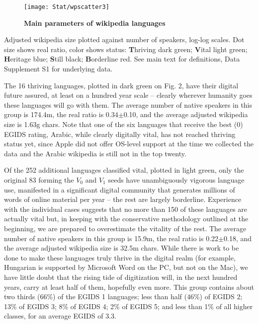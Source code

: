 \documentclass[10pt]{article}
\begin{document}
\newpage
\begin{figure}
\vspace*{-8mm}\hspace*{-20mm}\texttt{[image: Stat/wpscatter3]}



\caption{
{\bf Main parameters of wikipedia languages}
}
\label{Figure_2}
\end{figure}
Adjusted wikipedia size plotted against number of speakers, log-log scales.
Dot size shows real ratio, color shows status: {\bf T}hriving dark green; {\bf
  V}ital light green; {\bf H}eritage blue; {\bf S}till black; {\bf B}orderline
red. See main text for definitions, Data Supplement S1 for underlying data.




\medskip
The 16 thriving languages, plotted in dark green on Fig. 2, have their
digital future assured, at least on a hundred year scale -- clearly wherever
humanity goes these languages will go with them. The average number of native
speakers in this group is 174.4m, the real ratio is 0.34$\pm$0.10, and the
average adjusted wikipedia size is 1.63g chars. Note that one of the six
languages that receive the best (0) EGIDS rating, Arabic, while clearly
digitally vital, has not reached thriving status yet, since Apple did not
offer OS-level support at the time we collected the data and the Arabic
wikipedia is still not in the top twenty. 

Of the 252 additional languages classified vital, plotted in light green, only
the original 83 forming the $V_0$ and $V_1$ seeds have unambiguously vigorous
language use, manifested in a significant digital community that generates
millions of words of online material per year -- the rest are largely
borderline. Experience with the individual cases suggests that no more than
150 of these languages are actually vital but, in keeping with the
conservative methodology outlined at the beginning, we are prepared to
overestimate the vitality of the rest.  The average number of native speakers
in this group is 15.9m, the real ratio is 0.22$\pm$0.18, and the average
adjusted wikipedia size is 32.5m chars.  While there is work to be done to
make these languages truly thrive in the digital realm (for example, Hungarian
is supported by Microsoft Word on the PC, but not on the Mac), we have little
doubt that the rising tide of digitization will, in the next hundred years,
carry at least half of them, hopefully even more. This group contains about
two thirds (66\%) of the EGIDS 1 languages; less than half (46\%) of EGIDS 2;
13\% of EGIDS 3; 8\% of EGIDS 4; 2\% of EGIDS 5; and less than 1\% of all
higher classes, for an average EGIDS of 3.3.
\end{document}
